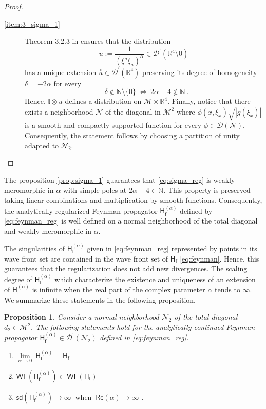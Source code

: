 \documentclass[11pt]{book}
\newcommand{\WF}{\mathsf{WF}}
\newcommand{\sd}{\mathsf{sd}}
\renewcommand{\Re}{\mathsf{Re}}
\newcommand{\abs}[1]{\left|#1\right|}
\newcommand{\exte}[1]{\overset{\circ}{#1}}
\newcommand{\Dcal}{\mathcal{D}}
\newcommand{\Mcal}{\mathcal{M}}
\newcommand{\Ncal}{\mathcal{N}}
\newcommand{\Ibb}{\mathbb{I}}
\newcommand{\Nbb}{\mathbb{N}}
\newcommand{\Rbb}{\mathbb{R}}
\newcommand{\Hsf}{\mathsf{H}}
\newcommand{\fsf}{\mathsf{f}}
\theoremstyle{break}
\newtheorem{proposition}{Proposition}[chapter]
\begin{document}
\begin{proof}
\begin{description}
\item[\ref{item:3_sigma_1}] Theorem 3.2.3 in \cite{HORMANDER_1990} ensures that the distribution 
%
\begin{equation*}
u := \frac{1}{(\xi^{a}{\xi}_{a})^\alpha} \in\Dcal^\prime(\Rbb^4\setminus  0) 
\end{equation*}
%
has a unique extension $\exte{u} \in \Dcal^\prime(\Rbb^4)$ preserving its degree of homogeneity $\delta=-2\alpha$ for every 
%
\begin{equation*}
-\delta\notin\Nbb\setminus\{0\} \ \Leftrightarrow \ 2\alpha-4 \notin \Nbb \ .
\end{equation*}
%
Hence, $\Ibb\otimes u$ defines a distribution on $\Mcal \times \Rbb^4$.
Finally, notice that there exists a neighborhood $\Ncal$ of the diagonal in $\Mcal^2$
where $\phi(x,\xi_x) \sqrt{\abs{g(\xi_x)}}$ is a smooth and compactly supported function for every $\phi\in \Dcal(\Ncal)$. Consequently, the statement follows by choosing a partition of unity adapted to $\Ncal_2$.
\end{description}
%
\end{proof}


The proposition \ref{prop:sigma_1} guarantees that \eqref{eq:sigma_reg} is weakly meromorphic in $\alpha$ with simple poles at $2\alpha-4\in\Nbb$. This property is preserved taking linear combinations and multiplication by smooth functions. Consequently, the analytically regularized Feynman propagator $\Hsf^{(\alpha)}_\fsf$ defined by \eqref{eq:feynman_reg} is well defined on a normal neighborhood of the total diagonal and weakly meromorphic in $\alpha$. 


The singularities of $\Hsf^{(\alpha)}_\fsf$ given in \eqref{eq:feynman_reg} represented by points in its wave front set are contained in the wave front set of $\Hsf_\fsf$ \eqref{eq:feynman}. Hence, this guarantees that the regularization does not add new divergences. The scaling degree of $\Hsf^{(\alpha)}_\fsf$  which characterize the existence and uniqueness of an extension of $\Hsf^{(\alpha)}_\fsf$ is infinite when the real part of the complex parameter $\alpha$ tends to $\infty$. We summarize these statements in the following proposition.


\begin{proposition}\label{prop:wf_h_reg}
Consider a normal neighborhood $\Ncal_2$ of the total diagonal $d_2\in\Mcal^2$. The following statements hold for the analytically continued Feynman propagator $\Hsf^{(\alpha)}_\fsf\in\Dcal^\prime(\Ncal_2)$ defined in \eqref{eq:feynman_reg}.
%
\begin{enumerate}
\item\label{item:1_wf_h_reg} $\underset{\alpha \to 0}{\lim} \ \Hsf^{(\alpha)}_\fsf = \Hsf_\fsf$
%
\item\label{item:2_wf_h_reg} $\WF\left(\Hsf^{(\alpha)}_\fsf\right) \subset \WF\left(\Hsf_\fsf\right)$
%
\item\label{item:3_wf_h_reg} $\sd\left(\Hsf^{(\alpha)}_\fsf\right) \to \infty \ \mbox{ when } \ \Re\left(\alpha\right) \to \infty$ .
\end{enumerate}
%
\end{proposition}
\end{document}
